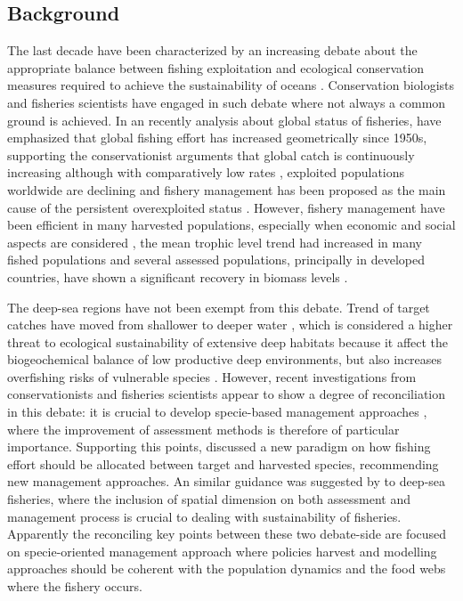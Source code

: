 \subsection*{Background}

The last decade have been characterized by an increasing debate about the appropriate balance between fishing exploitation and ecological conservation measures required to achieve the sustainability of oceans \citep{Hilborn2013,Worm2009,Worm2013a,Pauly1998}. Conservation biologists and fisheries scientists have engaged in such debate where not always a common ground is achieved. In an recently analysis about global status of fisheries, \citet{Watson2013a} have emphasized that global fishing effort has increased geometrically since 1950s,  supporting the conservationist  arguments that global catch is continuously increasing although with comparatively low rates \citep{Pauly2005,Juan-Jorda2011}, exploited populations worldwide are declining \citep{Myers2003} and  fishery management has been proposed as the main cause of the persistent overexploited status \citep{Worm2006,WormBranch2012}. However, fishery management have been efficient in many harvested populations, especially when economic and social aspects are considered \citep{Hilborn2014}, the mean trophic level trend had increased in many fished populations  \citep{Branch2010,Sethi2010} and several assessed populations, principally in developed countries, have shown a significant recovery in biomass levels \citep{Costello2012}.

The deep-sea regions have not been exempt from this debate. Trend of target catches have moved from shallower to deeper water \citep{Morato2006,Watson2013}, which is considered a higher threat to ecological sustainability of extensive deep habitats because it affect the biogeochemical balance of low productive deep environments, but also increases overfishing risks of vulnerable species \citep{Norse2012,Mengerink2014}. However, recent investigations from conservationists and fisheries scientists appear to show a degree of  reconciliation in this debate: it is crucial to develop specie-based management approaches \citep{WormBranch2012,VanDover2014}, where the improvement of assessment methods \citep{Hilborn2014,White2014} is therefore of particular importance. Supporting this points, \citet{Zhou2014} discussed a new paradigm on how fishing effort should be allocated between target and harvested species, recommending new management approaches. An similar guidance was suggested by \citet{Clark2012} to deep-sea fisheries, where the inclusion of spatial dimension on both assessment and management process is crucial to dealing with sustainability of fisheries. Apparently the reconciling key points between these two debate-side are focused on specie-oriented management approach where policies harvest and modelling approaches  should be coherent with the  population dynamics and the food webs where the fishery occurs.

